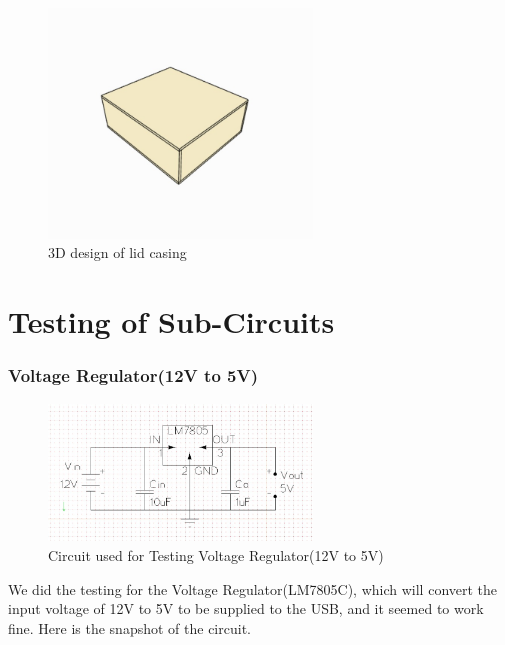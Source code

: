 \documentclass[12pt]{article}
\begin{document}
\begin{figure}[h]
    \centering
    \includegraphics[width=7cm]{lid 3d.jpeg}
    \caption{3D design of lid casing}
    \label{fig:galaxy}
\end{figure}


\maketitle
\section{Testing of Sub-Circuits}
\subsubsection{Voltage Regulator(12V to 5V)}

\begin{figure}[h]
    \centering
    \includegraphics[width=7cm]{lm7805.jpeg}
    \caption{Circuit used for Testing Voltage Regulator(12V to 5V)}
    \label{fig:galaxy}
\end{figure}


We did the testing for the Voltage Regulator(LM7805C), which will convert the input voltage of 12V to 5V to be supplied to the USB, and it seemed to work fine.
Here is the snapshot of the circuit.
\end{document}
